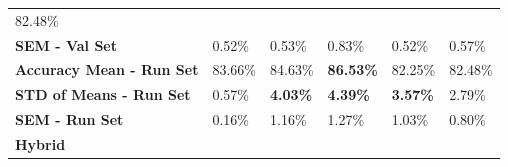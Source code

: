 \begin{longtable}[c]{@{}llllll@{}}
  \cellcolor[HTML]{FFE699}82.48\% \\
\textbf{SEM - Val Set} &
  \cellcolor[HTML]{E2EFDA}0.52\% &
  \cellcolor[HTML]{FFE699}0.53\% &
  \cellcolor[HTML]{D9E1F2}0.83\% &
  \cellcolor[HTML]{E2EFDA}0.52\% &
  \cellcolor[HTML]{FFE699}0.57\% \\
\textbf{Accuracy Mean - Run Set} &
  \cellcolor[HTML]{E2EFDA}83.66\% &
  \cellcolor[HTML]{FFE699}84.63\% &
  \cellcolor[HTML]{D9E1F2}\textbf{86.53\%} &
  \cellcolor[HTML]{E2EFDA}82.25\% &
  \cellcolor[HTML]{FFE699}82.48\% \\
\textbf{STD of Means - Run Set} &
  \cellcolor[HTML]{E2EFDA}0.57\% &
  \cellcolor[HTML]{FFE699}\textbf{4.03\%} &
  \cellcolor[HTML]{D9E1F2}\textbf{4.39\%} &
  \cellcolor[HTML]{E2EFDA}\textbf{3.57\%} &
  \cellcolor[HTML]{FFE699}2.79\% \\
\textbf{SEM - Run Set} &
  \cellcolor[HTML]{E2EFDA}0.16\% &
  \cellcolor[HTML]{FFE699}1.16\% &
  \cellcolor[HTML]{D9E1F2}1.27\% &
  \cellcolor[HTML]{E2EFDA}1.03\% &
  \cellcolor[HTML]{FFE699}0.80\% \\
  \toprule
\rowcolor[HTML]{E7E6E6} 
\textbf{Hybrid} &
   &
   &
   &
   &
   \\
   

\end{longtable}
